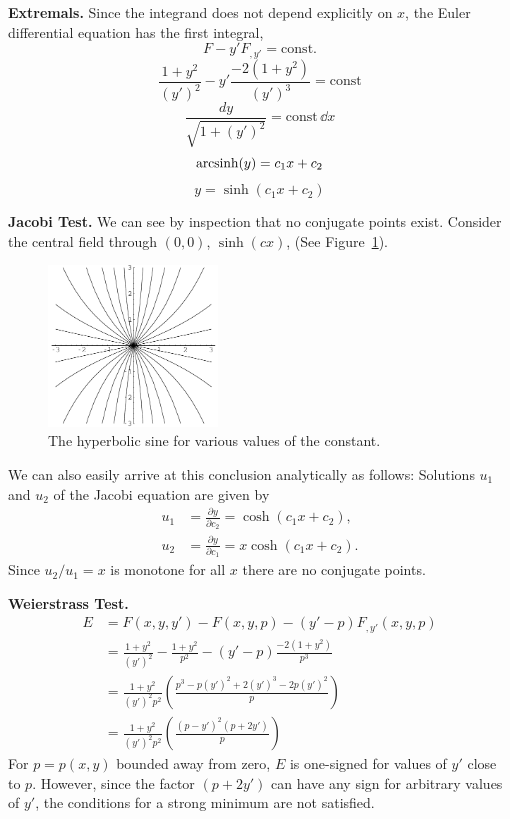 \begin{Solution}
  \textbf{Extremals.}
  Since the integrand does not depend explicitly on $x$, the Euler differential
  equation has the first integral,
  \[
  F - y' F_{,y'} = \mathrm{const}.
  \]
  \[
  \frac{1 + y^2}{(y')^2} - y' \frac{-2(1 + y^2)}{(y')^3} = \mathrm{const}
  \]
  \[
  \frac{d y}{\sqrt{1 + (y')^2}} = \mathrm{const} \,\dd x
  \]
  \[
  \mathop{\mathrm{arcsinh}}\nolimits( y ) = c_1 x + c_2
  \]
  \[
  \boxed{
    y = \sinh( c_1 x + c_2 )
    }
  \]


  \textbf{Jacobi Test.}
  We can see by inspection that no conjugate points exist.  Consider the
  central field through $(0,0)$, $\sinh(c x)$, (See Figure~\ref{sinh}).

  \begin{figure}[h!]
    \begin{center}
      \includegraphics[width=0.4\textwidth]{cv/cv/sinh}
    \end{center}
    \caption{The hyperbolic sine for various values of the constant.}
    \label{sinh}
  \end{figure}

  We can also easily arrive at this conclusion analytically as follows:
  Solutions $u_1$ and $u_2$ of the Jacobi equation are given by
  \begin{align*}
    u_1 &= \frac{\partial y}{\partial c_2} = \cosh(c_1 x + c_2), \\
    u_2 &= \frac{\partial y}{\partial c_1} = x \cosh(c_1 x + c_2).
  \end{align*}
  Since $u_2 / u_1 = x$ is monotone for all $x$ there are no conjugate points.




  \textbf{Weierstrass Test.}
  \begin{align*}
    E       &= F(x,y,y') - F(x,y,p) - (y'-p) F_{,y'}(x,y,p) \\
    &= \frac{ 1 + y^2 }{ (y')^2 } - \frac{ 1 + y^2 }{ p^2 }
    - (y' - p) \frac{-2 (1 + y^2) }{ p^3 } \\
    &= \frac{ 1 + y^2 }{ (y')^2 p^2 } \left(
      \frac{ p^3 - p (y')^2 + 2 (y')^3 - 2 p (y')^2 }{ p } \right)\\
    &= \frac{ 1 + y^2 }{ (y')^2 p^2 } \left(
      \frac{ (p - y')^2 (p + 2 y') }{ p } \right)
  \end{align*}
  For $p = p(x,y)$ bounded away from zero, $E$ is one-signed for values of
  $y'$ close to $p$.  However, since the factor $(p + 2y')$ can have any
  sign for arbitrary values of $y'$, the conditions for a strong minimum
  are not satisfied.


\end{Solution}
